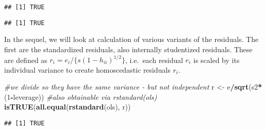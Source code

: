 \documentclass[]{book}
\newenvironment{Shaded}{\begin{snugshade}}{\end{snugshade}}
\newcommand{\CommentTok}[1]{\textcolor[rgb]{0.56,0.35,0.01}{\textit{#1}}}
\newcommand{\DecValTok}[1]{\textcolor[rgb]{0.00,0.00,0.81}{#1}}
\newcommand{\KeywordTok}[1]{\textcolor[rgb]{0.13,0.29,0.53}{\textbf{#1}}}
\newcommand{\NormalTok}[1]{#1}
\newcommand{\OperatorTok}[1]{\textcolor[rgb]{0.81,0.36,0.00}{\textbf{#1}}}
\newcommand{\StringTok}[1]{\textcolor[rgb]{0.31,0.60,0.02}{#1}}
\theoremstyle{definition}
\theoremstyle{definition}
\theoremstyle{definition}
\theoremstyle{remark}
\begin{document}
\begin{Shaded}
\end{Shaded}

\begin{verbatim}
## [1] TRUE
\end{verbatim}

\begin{Shaded}
\end{Shaded}

\begin{verbatim}
## [1] TRUE
\end{verbatim}

In the sequel, we will look at calculation of various variants of the residuals. The first are the standardized residuals, also internally studentized residuals. These are defined as \(r_i = e_i/\{s(1-h_{ii})^{1/2}\}\), i.e.~each residual \(e_i\) is scaled by its individual variance to create homoscedastic residuals \(r_i\).

\begin{Shaded}
\begin{Highlighting}[]
\CommentTok{#we divide so they have the same variance - but not independent}
\NormalTok{r <-}\StringTok{ }\NormalTok{e}\OperatorTok{/}\KeywordTok{sqrt}\NormalTok{(s2}\OperatorTok{*}\NormalTok{(}\DecValTok{1}\OperatorTok{-}\NormalTok{leverage)) }
\CommentTok{#also obtainable via rstandard(ols)}
\KeywordTok{isTRUE}\NormalTok{(}\KeywordTok{all.equal}\NormalTok{(}\KeywordTok{rstandard}\NormalTok{(ols), r))}
\end{Highlighting}
\end{Shaded}

\begin{verbatim}
## [1] TRUE
\end{verbatim}
\end{document}
